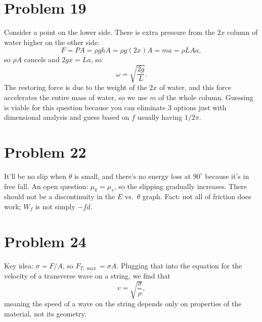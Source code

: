 \documentclass[11pt]{article}
\begin{document}
\section*{Problem 19}
Consider a point on the lower side. There is extra pressure from the $2x$ column of water higher on the other side:
\[
F=PA=\rho ghA=\rho g(2x)A=ma=\rho LAa,
\]
so $\rho A$ cancels and $2gx=La$, so
\[
\omega=\sqrt{\frac{2g}{L}}.
\]
The restoring force is due to the weight of the $2x$ of water, and this force accelerates the entire mass of water, so we use $m$ of the whole column.
Guessing is viable for this question because you can eliminate 3 options just with dimensional analysis and guess based on $f$ usually having $1/2\pi$.

\begin{center}
\end{center}

\section*{Problem 22}
It'll be no slip when $\theta$ is small, and there's no energy loss at $90^\circ$ because it's in free fall.
An open question: $\mu_k=\mu_s$, so the slipping gradually increases. There should not be a discontinuity in the $E$ vs.\ $\theta$ graph.
Fact: not all of friction does work; $W_f$ is not simply $-fd$.

\section*{Problem 24}
Key idea: $\sigma=F/A$, so $F_{T,\max}=\sigma A$. Plugging that into the equation for the velocity of a transverse wave on a string, we find that
\[
v=\sqrt{\frac{\sigma}{\rho}},
\]
meaning the speed of a wave on the string depends only on properties of the material, not its geometry.
\end{document}
